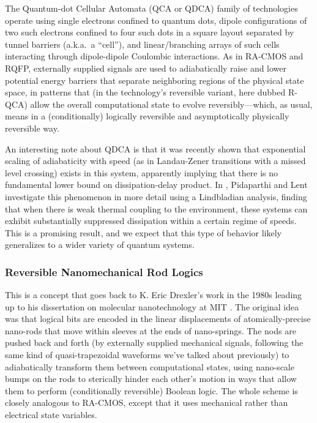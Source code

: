 \documentclass[preprints,article,accept,moreauthors,pdftex]{Definitions/mdpi}
\begin{document}
\begin{paracol}{2}
The Quantum-dot Cellular Automata (QCA or QDCA) \cite{Lent+93,Amlani+99,LI03} family of technologies operate using single electrons confined to quantum dots, dipole configurations of two such electrons confined to four such dots in a square layout separated by tunnel barriers (a.k.a.\ a ``cell''), and linear/branching arrays of such cells interacting through dipole-dipole Coulombic interactions. As in RA-CMOS and RQFP, externally supplied signals are used to adiabatically raise and lower potential energy barriers that separate neighboring regions of the physical state space, in patterns that (in the technology's reversible variant, here dubbed R-QCA) allow the overall computational state to evolve reversibly---which, as usual, means in a (conditionally) logically reversible and asymptotically physically reversible way. 

An interesting note about QDCA is that it was recently shown \cite{PL18} that exponential scaling of adiabaticity with speed (as in Landau-Zener transitions with a missed level crossing) exists in this system, apparently implying that there is no fundamental lower bound on dissipation-delay product. In \cite{PL21}, Pidaparthi and Lent investigate this phenomenon in more detail using a Lindbladian analysis, finding that when there is weak thermal coupling to the environment, these systems can exhibit substantially suppressed dissipation within a certain regime of speeds. This is a promising result, and we expect that this type of behavior likely generalizes to a wider variety of quantum systems.

\subsubsection{Reversible Nanomechanical Rod Logics}
\label{sssec:rnrl}

This is a concept that goes back to K. Eric Drexler's work in the 1980s leading up to his dissertation on molecular nanotechnology at MIT \cite{Drexler81,Drexler91,Drexler92}. The original idea was that logical bits are encoded in the linear displacements of atomically-precise nano-rods that move within sleeves at the ends of nano-springs. The nods are pushed back and forth (by externally supplied mechanical signals, following the same kind of quasi-trapezoidal waveforms we've talked about previously) to adiabatically transform them between computational states, using nano-scale bumps on the rods to sterically hinder each other's motion in ways that allow them to perform (conditionally reversible) Boolean logic. The whole scheme is closely analogous to RA-CMOS, except that it uses mechanical rather than electrical state variables.


\end{paracol}
\end{document}
